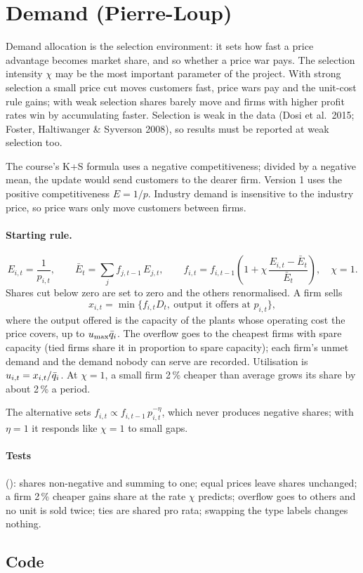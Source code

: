 \section{Demand (Pierre-Loup)}\label{sec:demand}

Demand allocation is the selection environment: it sets how fast a price advantage becomes
market share, and so whether a price war pays. The selection intensity $\chi$ may be the
most important parameter of the project. With strong selection a small price cut moves
customers fast, price wars pay and the unit-cost rule gains; with weak selection shares
barely move and firms with higher profit rates win by accumulating faster. Selection is weak
in the data (Dosi et al.\ 2015; Foster, Haltiwanger \& Syverson 2008), so results must be
reported at weak selection too.

The course's K+S formula uses a negative competitiveness; divided by a negative mean, the
update would send customers to the dearer firm. Version 1 uses the positive
competitiveness $E = 1/p$. Industry demand is insensitive to the industry price, so price
wars only move customers between firms.

\paragraph{Starting rule.}
\[
E_{i,t} = \frac{1}{p_{i,t}}, \qquad \bar E_t = \sum_j f_{j,t-1}\, E_{j,t}, \qquad
f_{i,t} = f_{i,t-1}\left(1 + \chi\, \frac{E_{i,t} - \bar E_t}{\bar E_t}\right), \quad \chi = 1.
\]
Shares cut below zero are set to zero and the others renormalised. A firm sells
\[
x_{i,t} = \min\{f_{i,t} D_t,\ \text{output it offers at } p_{i,t}\},
\]
where the output
offered is the capacity of the plants whose operating cost the price covers, up to
$u_{\max}\bar q_i$. The overflow goes to the cheapest firms with spare capacity (tied firms
share it in proportion to spare capacity); each firm's unmet demand and the demand nobody
can serve are recorded. Utilisation is $u_{i,t} = x_{i,t}/\bar q_i$. At $\chi = 1$, a small
firm 2\,\% cheaper than average grows its share by about 2\,\% a period.

The alternative  sets $f_{i,t} \propto f_{i,t-1}\, p_{i,t}^{-\eta}$,
which never produces negative shares; with $\eta = 1$ it responds like $\chi = 1$ to small
gaps.

\paragraph{Tests} (): shares non-negative and summing to one;
equal prices leave shares unchanged; a firm 2\,\% cheaper gains share at the rate $\chi$
predicts; overflow goes to others and no unit is sold twice; ties are shared pro rata;
swapping the type labels changes nothing.

\subsection*{Code}
